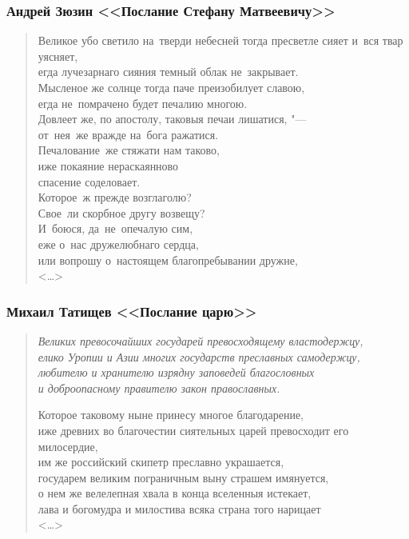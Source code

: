\documentclass{beamer}
\begin{document}
\begin{frame}
\frametitle{Андрей Зюзин <<Послание Стефану Матвеевичу>>}

\begin{verse}
Великое убо светило на~тверди небесней тогда пресветле сияет и~вся твар уясняет,\\
егда лучезарнаго сияния темный облак не~закрывает.\\
Мысленое же солнце тогда паче преизобилует славою,\\
егда не~помрачено будет печалию многою.\\
Довлеет же, по апостолу, таковыя печаи лишатися, "---\\
от~нея~же вражде на~бога ражатися.\\
Печалование~же стяжати нам таково,\\
иже покаяние нераскаянново\\
спасение соделовает.\\
Которое~ж прежде возглаголю?\\
Свое~ли скорбное другу возвещу?\\
И~боюся, да~не~опечалую сим,\\
еже о~нас дружелюбнаго сердца,\\
или вопрошу о~настоящем благопребывании дружне,\\
<\dots>
\end{verse}

\end{frame}


\begin{frame}
\frametitle{Михаил Татищев <<Послание царю>>}

\begin{verse}
\textit{Великих превосочайших государей превосходящему властодержцу,\\
елико Уропии и Азии многих государств преславных самодержцу,\\
любителю и хранителю изрядну заповедей благословных\\
и доброопасному правителю закон православных.}

Которое таковому ныне принесу многое благодарение,\\
иже древних во благочестии сиятельных царей превосходит его милосердие,\\
им же российский скипетр преславно украшается,\\
государем великим пограничным выну страшем имянуется,\\
о нем же велелепная хвала в конца вселенныя истекает,\\
лава и богомудра и милостива всяка страна того нарицает\\
<\dots>
\end{verse}

\end{frame}
\end{document}
